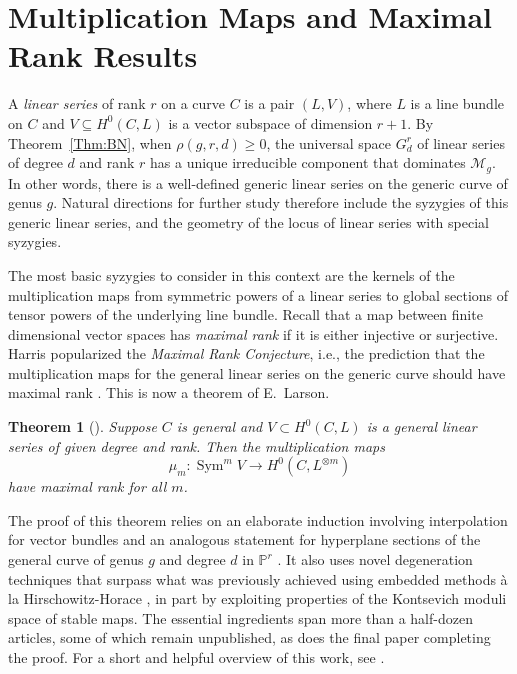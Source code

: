 \documentclass{amsart}
\newtheorem{theorem}{Theorem}[section]
\theoremstyle{definition}
\newcommand{\PP}{\mathbb{P}}
\newcommand{\Sym}{\operatorname{Sym}}
\begin{document}
\section{Multiplication Maps and Maximal Rank Results}
\label{Sec:MRC}

A \emph{linear series} of rank $r$ on a curve $C$ is a pair $(L,V)$, where $L$ is a line bundle on $C$ and $V \subseteq H^0(C,L)$ is a vector subspace of dimension $r+1$.  By Theorem~\ref{Thm:BN}, when $\rho(g,r,d) \geq 0$, the universal space $G^r_d$ of linear series of degree $d$ and rank $r$ has a unique irreducible component that dominates $\mathcal{M}_g$. In other words, there is a well-defined generic linear series on the generic curve of genus $g$. Natural directions for further study therefore include the syzygies of this generic linear series, and the geometry of the locus of linear series with special syzygies. 

The most basic syzygies to consider in this context are the kernels of the multiplication maps from symmetric powers of a linear series to global sections of tensor powers of the underlying line bundle.  Recall that a map between finite dimensional vector spaces has \emph{maximal rank} if it is either injective or surjective.  Harris popularized the \emph{Maximal Rank Conjecture}, i.e., the prediction that the multiplication maps for the general linear series on the generic curve should have maximal rank \cite{Harris82}. This is now a theorem of E.~Larson.

\begin{theorem} [\cite{Larson17}] \label{Thm:MRC}
Suppose $C$ is general and $V \subset H^0(C,L)$ is a general linear series of given degree and rank.  Then the multiplication maps
\[
\mu_m: \Sym^m V \rightarrow H^0(C,L^{\otimes m})
\]
have maximal rank for all $m$.
\end{theorem}

The proof of this theorem relies on an elaborate induction involving interpolation for vector bundles \cite{AtanasovLarsonYang19} and an analogous statement for hyperplane sections of the general curve of genus $g$ and degree $d$ in $\PP^r$ \cite{Larson20}. It also uses novel degeneration techniques that surpass what was previously achieved using embedded methods \`a la Hirschowitz-Horace \cite{Hirschowitz85}, in part by exploiting properties of the Kontsevich moduli space of stable maps. The essential ingredients span more than a half-dozen articles, some of which remain unpublished, as does the final paper completing the proof.  For a short and helpful overview of this work, see \cite{Larson18}.
\end{document}
